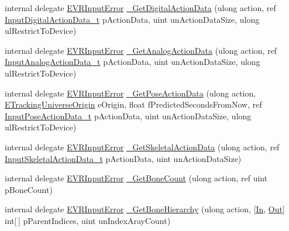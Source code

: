 \begin{DoxyCompactItemize}
\item 
internal delegate \mbox{\hyperlink{namespace_valve_1_1_v_r_a592d7f4189b8346d6c96dbdbaa35bc1b}{E\+V\+R\+Input\+Error}} \mbox{\hyperlink{struct_valve_1_1_v_r_1_1_i_v_r_input_a376552d06df56ac9589e5014e3f04908}{\+\_\+\+Get\+Digital\+Action\+Data}} (ulong action, ref \mbox{\hyperlink{struct_valve_1_1_v_r_1_1_input_digital_action_data__t}{Input\+Digital\+Action\+Data\+\_\+t}} p\+Action\+Data, uint un\+Action\+Data\+Size, ulong ul\+Restrict\+To\+Device)
\item 
internal delegate \mbox{\hyperlink{namespace_valve_1_1_v_r_a592d7f4189b8346d6c96dbdbaa35bc1b}{E\+V\+R\+Input\+Error}} \mbox{\hyperlink{struct_valve_1_1_v_r_1_1_i_v_r_input_a3e6eea8d879b201cac5deced936b5298}{\+\_\+\+Get\+Analog\+Action\+Data}} (ulong action, ref \mbox{\hyperlink{struct_valve_1_1_v_r_1_1_input_analog_action_data__t}{Input\+Analog\+Action\+Data\+\_\+t}} p\+Action\+Data, uint un\+Action\+Data\+Size, ulong ul\+Restrict\+To\+Device)
\item 
internal delegate \mbox{\hyperlink{namespace_valve_1_1_v_r_a592d7f4189b8346d6c96dbdbaa35bc1b}{E\+V\+R\+Input\+Error}} \mbox{\hyperlink{struct_valve_1_1_v_r_1_1_i_v_r_input_aeb5a782b37d5126d81e5a1a21fa69500}{\+\_\+\+Get\+Pose\+Action\+Data}} (ulong action, \mbox{\hyperlink{namespace_valve_1_1_v_r_a29be99a3c2f780157bd490db06a7f12f}{E\+Tracking\+Universe\+Origin}} e\+Origin, float f\+Predicted\+Seconds\+From\+Now, ref \mbox{\hyperlink{struct_valve_1_1_v_r_1_1_input_pose_action_data__t}{Input\+Pose\+Action\+Data\+\_\+t}} p\+Action\+Data, uint un\+Action\+Data\+Size, ulong ul\+Restrict\+To\+Device)
\item 
internal delegate \mbox{\hyperlink{namespace_valve_1_1_v_r_a592d7f4189b8346d6c96dbdbaa35bc1b}{E\+V\+R\+Input\+Error}} \mbox{\hyperlink{struct_valve_1_1_v_r_1_1_i_v_r_input_ab2dfec875e32f9da69b95675a94957a7}{\+\_\+\+Get\+Skeletal\+Action\+Data}} (ulong action, ref \mbox{\hyperlink{struct_valve_1_1_v_r_1_1_input_skeletal_action_data__t}{Input\+Skeletal\+Action\+Data\+\_\+t}} p\+Action\+Data, uint un\+Action\+Data\+Size)
\item 
internal delegate \mbox{\hyperlink{namespace_valve_1_1_v_r_a592d7f4189b8346d6c96dbdbaa35bc1b}{E\+V\+R\+Input\+Error}} \mbox{\hyperlink{struct_valve_1_1_v_r_1_1_i_v_r_input_a45156426324aa529ba4317faa0ddbded}{\+\_\+\+Get\+Bone\+Count}} (ulong action, ref uint p\+Bone\+Count)
\item 
internal delegate \mbox{\hyperlink{namespace_valve_1_1_v_r_a592d7f4189b8346d6c96dbdbaa35bc1b}{E\+V\+R\+Input\+Error}} \mbox{\hyperlink{struct_valve_1_1_v_r_1_1_i_v_r_input_a1e1830a194a220b6947473ecfb0966db}{\+\_\+\+Get\+Bone\+Hierarchy}} (ulong action, \mbox{[}\mbox{\hyperlink{namespace_valve_1_1_v_r_a1e6192cb5ddaf204afab87ccb5728780aefeb369cccbd560588a756610865664c}{In}}, \mbox{\hyperlink{namespace_valve_1_1_v_r_a1e6192cb5ddaf204afab87ccb5728780a7c147cda9e49590f6abe83d118b7353b}{Out}}\mbox{]} int\mbox{[}$\,$\mbox{]} p\+Parent\+Indices, uint un\+Index\+Aray\+Count)

\end{DoxyCompactItemize}
